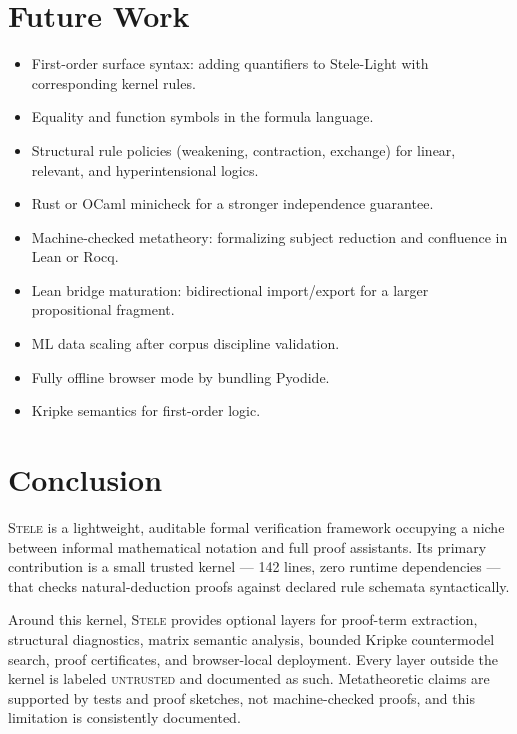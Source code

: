 \documentclass[11pt,a4paper]{article}
\theoremstyle{definition}
\theoremstyle{plain}
\newcommand{\stele}{\textsc{Stele}}
\newcommand{\untrusted}{\textsc{untrusted}}
\begin{document}
\section{Future Work}
\label{sec:future}

\begin{itemize}
  \item First-order surface syntax: adding quantifiers to
    Stele-Light with corresponding kernel rules.
  \item Equality and function symbols in the formula language.
  \item Structural rule policies (weakening, contraction,
    exchange) for linear, relevant, and hyperintensional logics.
  \item Rust or OCaml minicheck for a stronger independence
    guarantee.
  \item Machine-checked metatheory: formalizing subject
    reduction and confluence in Lean or Rocq.
  \item Lean bridge maturation: bidirectional import/export
    for a larger propositional fragment.
  \item ML data scaling after corpus discipline validation.
  \item Fully offline browser mode by bundling Pyodide.
  \item Kripke semantics for first-order logic.
\end{itemize}

\section{Conclusion}
\label{sec:conclusion}

\stele{} is a lightweight, auditable formal verification
framework occupying a niche between informal mathematical
notation and full proof assistants.
Its primary contribution is a small trusted kernel --- 142 lines,
zero runtime dependencies --- that checks natural-deduction
proofs against declared rule schemata syntactically.

Around this kernel, \stele{} provides optional layers for
proof-term extraction, structural diagnostics, matrix semantic
analysis, bounded Kripke countermodel search, proof certificates,
and browser-local deployment.
Every layer outside the kernel is labeled \untrusted{} and
documented as such.
Metatheoretic claims are supported by tests and proof sketches,
not machine-checked proofs, and this limitation is consistently
documented.
\end{document}
